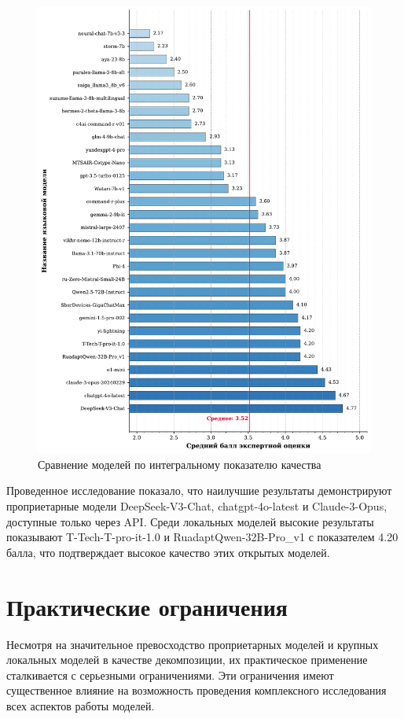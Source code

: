 \begin{figure}[H]
	\centering
	\includegraphics[width=1\textwidth]{images/model_performance_comparison.pdf}
	\caption{Сравнение моделей по интегральному показателю качества}
	\label{fig:quality}
\end{figure}

Проведенное исследование показало, что наилучшие результаты демонстрируют проприетарные модели DeepSeek-V3-Chat, chatgpt-4o-latest и Claude-3-Opus, доступные только через API. Среди локальных моделей высокие результаты показывают T-Tech-T-pro-it-1.0 и RuadaptQwen-32B-Pro\_v1 с показателем 4.20 балла, что подтверждает высокое качество этих открытых моделей.

\section{Практические ограничения}
Несмотря на значительное превосходство проприетарных моделей и крупных локальных моделей в качестве декомпозиции, их практическое применение сталкивается с серьезными ограничениями. Эти ограничения имеют существенное влияние на возможность проведения комплексного исследования всех аспектов работы моделей.


